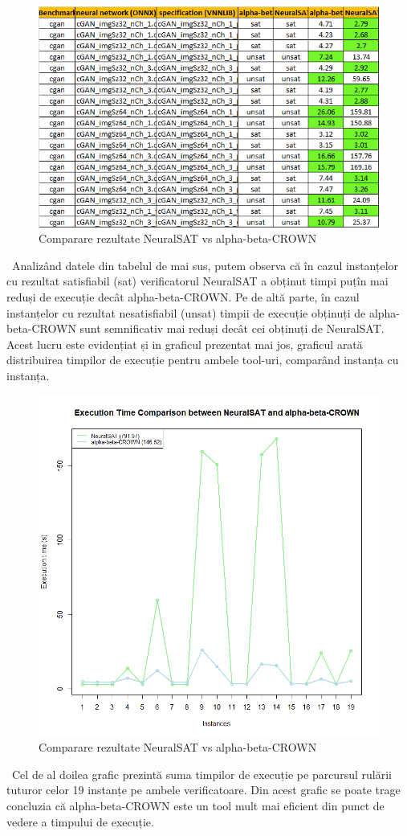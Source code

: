\begin{figure}[h]
\centering 
\includegraphics[width=0.8\linewidth]{imagini/interpretare rezultate/alpha-beta-CROWN_vs_NeuralSAT.png}
\caption{Comparare rezultate NeuralSAT vs alpha-beta-CROWN}
\label{fig:image2} 
\end{figure}
\
Analizând datele din tabelul de mai sus, putem observa că în cazul instanțelor cu rezultat satisfiabil (sat) verificatorul NeuralSAT a obținut timpi puțîn mai reduși de execuție decât alpha-beta-CROWN. Pe de altă parte, în cazul instanțelor cu rezultat nesatisfiabil (unsat) timpii de execuție obținuți de alpha-beta-CROWN sunt semnificativ mai reduși decât cei obținuți de NeuralSAT. Acest lucru este evidențiat și in graficul prezentat mai jos, graficul arată distribuirea timpilor de execuție pentru ambele tool-uri, comparând instanța cu instanța.



\begin{figure}[h]
\centering 
\includegraphics[width=0.8\linewidth]{imagini/interpretare rezultate/Exec_time_comparison.png}
\caption{Comparare rezultate NeuralSAT vs alpha-beta-CROWN}
\label{fig:image2} 
\end{figure}
\
Cel de al doilea grafic prezintă suma timpilor de execuție pe parcursul rulării tuturor celor 19 instanțe pe ambele verificatoare. Din acest grafic se poate trage concluzia că alpha-beta-CROWN este un tool mult mai eficient din punct de vedere a timpului de execuție.

